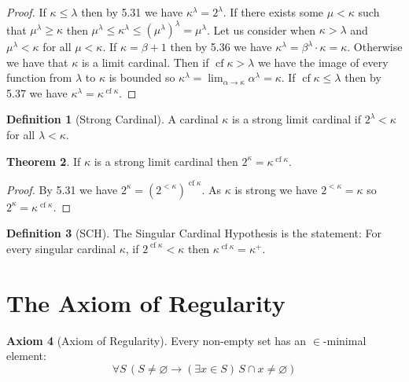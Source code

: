 \documentclass{article}
\theoremstyle{definition}
\newtheorem{thm}{Theorem}[section]
\newtheorem{defn}[thm]{Definition}
\newtheorem{axm}[thm]{Axiom}
\newcommand*{\mtset}{\ensuremath{\varnothing}}
\DeclareMathOperator{\cf}{cf}
\begin{document}
\begin{proof}
    If $\kappa \le \lambda$ then by 5.31 we have $\kappa^\lambda = 2^\lambda$. If there exists some $\mu < \kappa$ such that $\mu^\lambda \ge \kappa$ then $\mu^\lambda \le \kappa^\lambda \le (\mu^{\lambda})^\lambda = \mu^{\lambda}$. Let us consider when $\kappa > \lambda$ and $\mu^\lambda < \kappa$ for all $\mu < \kappa$. If $\kappa = \beta + 1$ then by 5.36 we have $\kappa^{\lambda} = \beta^\lambda \cdot \kappa = \kappa$. Otherwise we have that $\kappa$ is a limit cardinal. Then if $\cf \kappa > \lambda$ we have the image of every function from $\lambda$ to $\kappa$ is bounded so $\kappa^\lambda = \lim_{\alpha \to \kappa} \alpha^\lambda = \kappa$. If $\cf \kappa \le \lambda$ then by 5.37 we have $\kappa^\lambda = \kappa^{\cf \kappa}$.
\end{proof}

\begin{defn}[Strong Cardinal]
    A cardinal $\kappa$ is a strong limit cardinal if $2^{\lambda} < \kappa$ for all $\lambda < \kappa$.
\end{defn}

\begin{thm}
    If $\kappa$ is a strong limit cardinal then $2^{\kappa} = \kappa^{\cf \kappa}$.
\end{thm}

\begin{proof}
    By 5.31 we have $2^{\kappa} = (2^{< \kappa})^{\cf \kappa}$. As $\kappa$ is strong we have $2^{< \kappa} = \kappa$ so $2^{\kappa} = \kappa^{\cf \kappa}$.
\end{proof}

\begin{defn}[SCH]
    The Singular Cardinal Hypothesis is the statement: For every singular cardinal $\kappa$, if $2^{\cf \kappa} < \kappa$ then $\kappa^{\cf \kappa} = \kappa^+$.
\end{defn}

\newpage

\section{The Axiom of Regularity}

\begin{axm}[Axiom of Regularity]
    Every non-empty set has an $\in$-minimal element:
    \[
        \forall S \, (S \ne \mtset \to (\exists x \in S) \, S \cap x \ne \mtset )
    \]
\end{axm}
\end{document}
